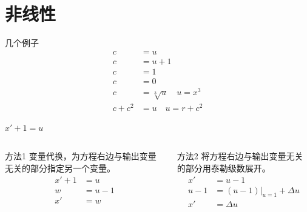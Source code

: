 \documentclass[presentation]{beamer}
\begin{document}
\section{非线性}
\label{sec:org425e4ac}
\begin{frame}[label={sec:orga66f575}]{几个例子}
\begin{align*}
c &= u\\
c &= u+1\\
c &= 1\\
c &= 0\\
c &= \sqrt[3]{u} \quad u= x^3 \\
c+c^2 &= u \quad u=r+c^{2}
\end{align*}
\end{frame}
\begin{frame}[label={sec:org7e4983a}]{\(x'+1 =u\)}
\begin{columns}
\begin{column}{0.5\columnwidth}
\begin{block}{方法1}
变量代换，为方程右边与输出变量无关的部分指定另一个变量。
\begin{align*}
x'+1 &= u \\
w &= u-1 \\
x' &= w 
\end{align*}
\end{block}
\end{column}

\begin{column}{0.5\columnwidth}
\begin{block}{方法2}
将方程右边与输出变量无关的部分用泰勒级数展开。
\begin{align*}
x' &=u-1 \\
u-1 &= (u-1)|_{u=1}+\Delta u \\
x' &= \Delta u 
\end{align*}
\end{block}
\end{column}
\end{columns}
\end{frame}
\end{document}

